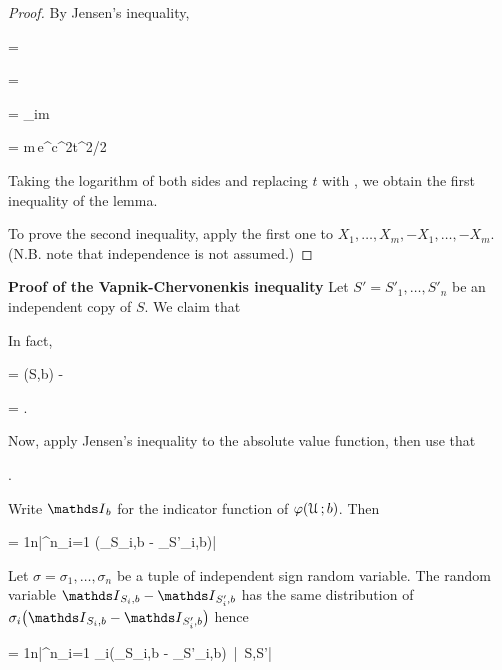 \documentclass[scombinatorics.tex]{subfiles}
\begin{document}
\begin{proof}
  By Jensen's inequality,

  {\le}
  {\Ex{}}

  \ceq{}
  {=}
  {\Ex{}}

  \ceq{}
  {=}
  {\Ex{}}

  \ceq{}
  {=}
  {\sum_{i\le m}\Ex\big[ e^{t X_i}\big]}

  \ceq{}
  {=}
  {m\,e^{c^2t^2/2}}

  Taking the logarithm of both sides and replacing $t$ with , we obtain the first inequality of the lemma.

  To prove the second inequality, apply the first one to $X_1,\dots,X_m, -X_1,\dots,-X_m$.
  (N.B. note that independence is not assumed.)
\end{proof}

\textbf{Proof of the Vapnik-Chervonenkis inequality}
  Let $S'=S'_1,\dots,S'_n$ be an independent copy of $S$.
  We claim that

  {\le}
  {\Ex{}}

  In fact,

  {=}
  {\Fr(S,b) - \Ex\big[\Fr(S',b)\big]}

  \ceq{}
  {=}
  {\Ex{}.}

  Now, apply Jensen's inequality to the absolute value function, then use that 

  {\le}
  {\Ex{}.}

  Write $\Indicator_b$ for the indicator function of $\varphi(\EuScript U\,;b)$.
  Then

  {=}
  {\frac1n\bigg|\sum^n_{i=1} \Big(\Indicator_{S_i,b} -  \Indicator_{S'_i,b}\Big)\bigg|}

  Let $\sigma=\sigma_1,\dots,\sigma_n$ be a tuple of independent sign random variable.
  The random variable $\Indicator_{S_i,b} -  \Indicator_{S'_i,b}$ has the same distribution of $\sigma_i\big(\Indicator_{S_i,b} -  \Indicator_{S'_i,b}\big)$ hence

  \ceq{}
  {=}
  {\frac1n\Ex\bigg|\sum^n_{i=1} \sigma_i\Big(\Indicator_{S_i,b} -  \Indicator_{S'_i,b}\Big)\ \Big|\ S,S'\bigg|}
\end{document}
